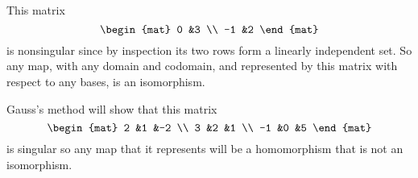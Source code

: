 \documentclass[10pt,t]{beamer}
\begin{document}
\begin{frame}
\ex
This matrix
\begin{equation*}
  \begin{mat}
    0  &3  \\
   -1  &2
  \end{mat}
\end{equation*}
is nonsingular since by inspection its two rows form a linearly independent
set.
So any map, with any domain and codomain, and represented by this matrix  
with respect to any bases,
is an isomorphism.

\pause
\ex
Gauss's method will show that this matrix
\begin{equation*}
  \begin{mat}
    2  &1  &-2  \\
    3  &2  &1   \\
   -1  &0  &5
  \end{mat}
\end{equation*}
is singular so any map that it represents will be a homomorphism that
is not an isomorphism.
\end{frame}




% 
\end{document}
